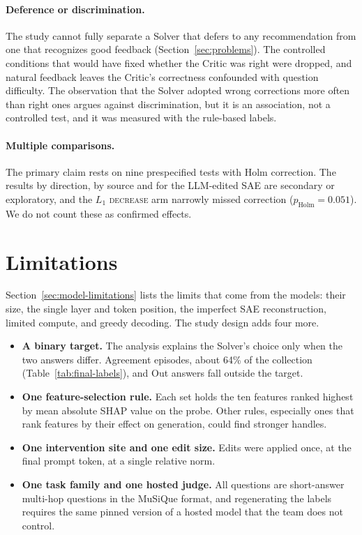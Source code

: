 \paragraph{Deference or discrimination.} The study cannot fully separate a
Solver that defers to any recommendation from one that recognizes good
feedback (Section~\ref{sec:problems}). The controlled conditions that would
have fixed whether the Critic was right were dropped, and natural feedback
leaves the Critic's correctness confounded with question difficulty. The
observation that the Solver adopted wrong corrections more often than right
ones argues against discrimination, but it is an association, not a
controlled test, and it was measured with the rule-based labels.

\paragraph{Multiple comparisons.} The primary claim rests on nine prespecified
tests with Holm correction. The results by direction, by source and for the
LLM-edited SAE are secondary or exploratory, and the $L_1$ \textsc{decrease}
arm narrowly missed correction ($p_{\mathrm{Holm}} = 0.051$). We do not count
these as confirmed effects.

\section{Limitations}

Section~\ref{sec:model-limitations} lists the limits that come from the
models: their size, the single layer and token position, the imperfect SAE
reconstruction, limited compute, and greedy decoding. The study design adds
four more.

\begin{itemize}
    \item \textbf{A binary target.} The analysis explains the Solver's choice
    only when the two answers differ. Agreement episodes, about 64\% of the
    collection (Table~\ref{tab:final-labels}), and Out answers fall outside
    the target.
    \item \textbf{One feature-selection rule.} Each set holds the ten features
    ranked highest by mean absolute SHAP value on the probe. Other rules,
    especially ones that rank features by their effect on generation, could
    find stronger handles.
    \item \textbf{One intervention site and one edit size.} Edits were applied
    once, at the final prompt token, at a single relative norm.
    \item \textbf{One task family and one hosted judge.} All questions are
    short-answer multi-hop questions in the MuSiQue format, and regenerating
    the labels requires the same pinned version of a hosted model that the
    team does not control.
\end{itemize}

